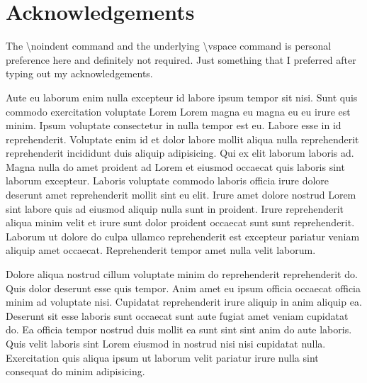 \chapter{Acknowledgements}

\noindent
The \textbackslash noindent command and the underlying \textbackslash vspace command is personal preference here and definitely not required. Just something that I preferred after typing out my acknowledgements.
\vspace{0.5\baselineskip}

\noindent
Aute eu laborum enim nulla excepteur id labore ipsum tempor sit nisi. Sunt quis commodo exercitation voluptate Lorem Lorem magna eu magna eu eu irure est minim. Ipsum voluptate consectetur in nulla tempor est eu. Labore esse in id reprehenderit. Voluptate enim id et dolor labore mollit aliqua nulla reprehenderit reprehenderit incididunt duis aliquip adipisicing.
Qui ex elit laborum laboris ad. Magna nulla do amet proident ad Lorem et eiusmod occaecat quis laboris sint laborum excepteur. Laboris voluptate commodo laboris officia irure dolore deserunt amet reprehenderit mollit sint eu elit. Irure amet dolore nostrud Lorem sint labore quis ad eiusmod aliquip nulla sunt in proident. Irure reprehenderit aliqua minim velit et irure sunt dolor proident occaecat sunt sunt reprehenderit. Laborum ut dolore do culpa ullamco reprehenderit est excepteur pariatur veniam aliquip amet occaecat. Reprehenderit tempor amet nulla velit laborum.
\vspace{0.5\baselineskip}

\noindent
Dolore aliqua nostrud cillum voluptate minim do reprehenderit reprehenderit do. Quis dolor deserunt esse quis tempor. Anim amet eu ipsum officia occaecat officia minim ad voluptate nisi.
Cupidatat reprehenderit irure aliquip in anim aliquip ea. Deserunt sit esse laboris sunt occaecat sunt aute fugiat amet veniam cupidatat do. Ea officia tempor nostrud duis mollit ea sunt sint sint anim do aute laboris. Quis velit laboris sint Lorem eiusmod in nostrud nisi nisi cupidatat nulla. Exercitation quis aliqua ipsum ut laborum velit pariatur irure nulla sint consequat do minim adipisicing.
\vspace{0.5\baselineskip}